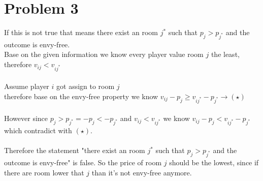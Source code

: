 \documentclass{article}
\begin{document}
\section{Problem 3}

If this is not true that means there exist an room $j^*$ such that $p_{j} > p_{j^*}$ and the outcome is envy-free.\\
Base on the given information we know every player value room $j$ the least, therefore $v_{ij} < v_{ij^*}$\\\\
Assume player $i$ got assign to room $j$
\\therefore base on the envy-free property we know $v_{ij} - p_j \geq v_{ij^*} - p_{j^*} \longrightarrow (\star)$\\\\
However since $p_{j} > p_{j^*} = -p_{j} < -p_{j^*}$ and  $v_{ij} < v_{ij^*}$ we know $v_{ij} - p_j < v_{ij^*} - p_{j^*}$ which contradict with $(\star)$.\\\\
Therefore the statement "there exist an room $j^*$ such that $p_{j} > p_{j^*}$ and the outcome is envy-free" is false. So the price of room $j$ should be the lowest, since if there are room lower that $j$ than it's not envy-free anymore.


\newpage
\end{document}
